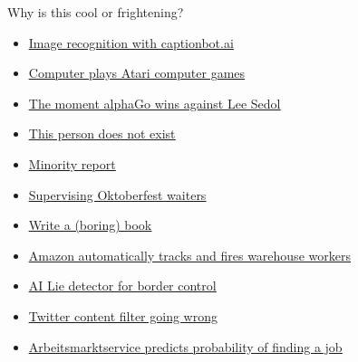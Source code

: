 \documentclass[color=usenames,dvipsnames]{beamer}
\begin{document}
\begin{frame}{Why is this cool or frightening?} 


\begin{itemize}
	
	\item \href{https://www.captionbot.ai/}{\underline{Image recognition with captionbot.ai}}

	\item \href{https://www.youtube.com/watch?time_continue=2&v=TmPfTpjtdgg}{\underline{Computer plays Atari computer games}}
			

	\item \href{https://youtu.be/rOL6QJdAlm8?t=103}{\underline{The moment alphaGo wins against Lee Sedol}}
			
	\item \href{https://www.thispersondoesnotexist.com/}{\underline{This person does not exist}}
	
	\item \href{https://www.newscientist.com/article/2186512-exclusive-uk-police-wants-ai-to-stop-violent-crime-before-it-happens/}{\underline{Minority report}}
		
	\item \href{https://dishtracker.at/?lang=de}{\underline{Supervising Oktoberfest waiters}}
	
	\item \href{https://link.springer.com/book/10.1007/978-3-030-16800-1}{\underline{Write a (boring) book}}
	
	\item \href{https://www.theverge.com/2019/4/25/18516004/amazon-warehouse-fulfillment-centers-productivity-firing-terminations}{\underline{Amazon automatically tracks and fires warehouse workers} }
	
	\item \href{https://gizmodo.com/an-ai-lie-detector-is-going-to-start-questioning-travel-1830126881}{\underline{AI Lie detector for border control}}
	
	\item \href{https://twitter.com/oe1/status/1119239287541833728?s=08}{\underline{Twitter content filter going wrong}}
	
	\item \href{https://futurezone.at/netzpolitik/computer-sagt-nein-algorithmus-gibt-frauen-weniger-chancen-beim-ams/400345297}{\underline{ Arbeitsmarktservice predicts probability of finding a job}}
	
\end{itemize}

\end{frame}
\end{document}
